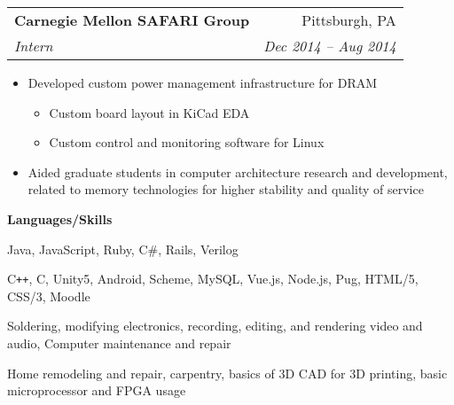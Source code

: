 \documentclass[letterpaper,11pt]{article}
\makeatletter
\newcommand{\resitem}[1]{\item #1}
\newcommand{\resheading}[1]{{\large \colorbox{shadingcolor}{\begin{minipage}{\textwidth}{\textbf{#1 \vphantom{p\^{E}}}}\end{minipage}}}}
\newcommand{\ressubheading}[4]{
\begin{tabular*}{\textwidth}{l@{\extracolsep{\fill}}r}
		\textbf{#1} & #2 \\
		\textit{#3} & \textit{#4} \\
\end{tabular*}\vspace{-6pt}}
\makeatother
\begin{document}
\begin{minipage}{\linewidth}
\begin{minipage}[t]{0.6\linewidth}
	\ressubheading{Carnegie Mellon SAFARI Group}{Pittsburgh, PA}{Intern}{Dec 2014 -- Aug 2014}
	\begin{itemize}[leftmargin=*,noitemsep]
		\resitem{Developed custom power management infrastructure for DRAM}
		\begin{itemize}[leftmargin=*,noitemsep,topsep=0pt]
			\resitem{Custom board layout in KiCad EDA}
			\resitem{Custom control and monitoring software for Linux}
		\end{itemize}
		\resitem{Aided graduate students in computer architecture research and development, related to memory technologies for higher stability and quality of service}
	\end{itemize}
\end{minipage}
\hfill
\begin{minipage}[t]{0.35\linewidth}
	\begin{minipage}[t]{\linewidth}
		\resheading{Languages/Skills}
		
		\begin{description}[noitemsep]
			\item[Strong:]
			Java, JavaScript, Ruby, C\#, Rails, Verilog
			\item[Weak:]
			C{}\verb!++!, C, Unity5, Android, Scheme, MySQL, Vue.js, Node.js, Pug, HTML/5, CSS/3, Moodle
			
			\vspace{0.1in}
			\item[Skills:]
			Soldering, modifying electronics, 
			recording, editing, and rendering video and audio, 
			Computer maintenance and repair
			\item[Misc Skills:]
			Home remodeling and repair, carpentry,
			basics of 3D CAD for 3D printing,
			basic microprocessor and FPGA usage
		\end{description}
	\end{minipage}
\end{minipage}
\end{minipage}
\end{document}
